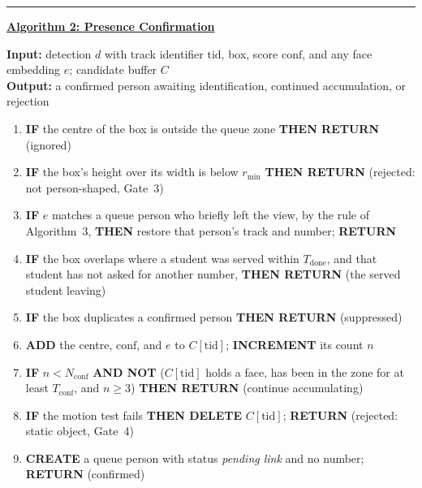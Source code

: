 \documentclass{research}
\newenvironment{algsteps}
  {\setlength{\topsep}{2pt}\begin{enumerate}%
   \setlength{\itemsep}{0pt}\setlength{\parsep}{0pt}}
  {\end{enumerate}}
\begin{document}
\vspace{0.5em}
\noindent\rule{\linewidth}{0.8pt}

\noindent\textbf{\underline{Algorithm 2: Presence Confirmation}}

\noindent\textbf{Input:} detection $d$ with track identifier
$\mathrm{tid}$, box, score $\text{conf}$, and any face embedding $e$;
candidate buffer $C$\\
\noindent\textbf{Output:} a confirmed person awaiting identification,
continued accumulation, or rejection

\begin{algsteps}
  \item \textbf{IF} the centre of the box is outside the queue zone
        \textbf{THEN RETURN} (ignored)
  \item \textbf{IF} the box's height over its width is below $r_{\min}$
        \textbf{THEN RETURN} (rejected: not person-shaped, Gate~3)
  \item \textbf{IF} $e$ matches a queue person who briefly left the view,
        by the rule of Algorithm~3, \textbf{THEN} restore that person's
        track and number; \textbf{RETURN}
  \item \textbf{IF} the box overlaps where a student was served within
        $T_{\mathrm{done}}$, and that student has not asked for another
        number, \textbf{THEN RETURN} (the served student leaving)
  \item \textbf{IF} the box duplicates a confirmed person \textbf{THEN
        RETURN} (suppressed)
  \item \textbf{ADD} the centre, $\text{conf}$, and $e$ to
        $C[\mathrm{tid}]$; \textbf{INCREMENT} its count $n$
  \item \textbf{IF} $n < N_{\mathrm{conf}}$ \textbf{AND NOT}
        ($C[\mathrm{tid}]$ holds a face, has been in the zone for at least
        $T_{\mathrm{conf}}$, and $n \geq 3$) \textbf{THEN RETURN}
        (continue accumulating)
  \item \textbf{IF} the motion test fails \textbf{THEN DELETE}
        $C[\mathrm{tid}]$; \textbf{RETURN} (rejected: static object,
        Gate~4)
  \item \textbf{CREATE} a queue person with status \emph{pending link}
        and no number; \textbf{RETURN} (confirmed)
\end{algsteps}
\vspace{0.3em}
\end{document}
